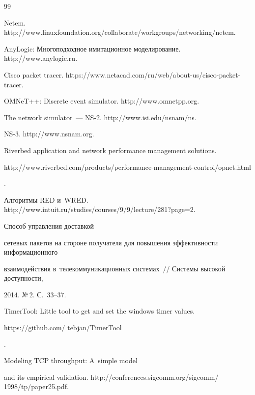 {\small\frenchspacing


{%




\begin{thebibliography}{99}




Netem. {\sf http://www.linuxfoundation.org/collaborate/workgroups/networking/netem}.




AnyLogic: Многоподходное имитационное моделирование. {\sf http://www.anylogic.ru}.




Cisco packet tracer. {\sf https://www.netacad.com/ru/web/about-us/cisco-packet-tracer}.




OMNeT++: Discrete event simulator. {\sf http://www.omnetpp.org}.




The network simulator~--- NS-2. {\sf http://www.isi.edu/nsnam/ns}.




NS-3. {\sf http://www.nsnam.org}.




Riverbed application and network performance management solutions. {\sf


http://www.riverbed.com/products/performance-management-control/opnet.html}.




Алгоритмы RED и~WRED. {\sf http://www.intuit.ru/studies/courses/9/9/lecture/281?\linebreak page=2}.




 Способ управления доставкой


сетевых пакетов на стороне получателя для повышения эффективности информационного


взаимодействия в~телекоммуникационных системах~/\!\!/ Системы высокой доступности,


2014. №\,2. С.~33--37.




TimerTool: Little tool to get and set the windows timer values. {\sf


https://github.com/ tebjan/TimerTool}.




 Modeling TCP throughput: A~simple model


and its empirical validation. {\sf http://conferences.sigcomm.org/sigcomm/ 1998/tp/paper25.pdf}.


\end{thebibliography}


} }









